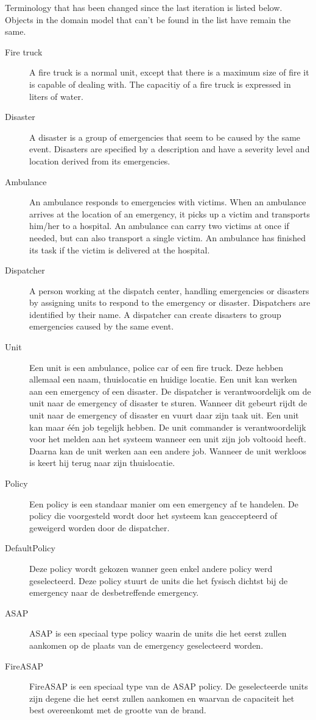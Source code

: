 \label{terminologie}
Terminology that has been changed since the last iteration is listed below. Objects in the domain model that can't be found in the list have remain the same.
\begin{description}
  \item[Fire truck] A fire truck is a normal unit, except that there is a maximum size of fire it is capable of dealing with. The capacitiy of a fire truck is expressed in liters of water.
  \item[Disaster] A disaster is a group of emergencies that seem to be caused by the same event. Disasters are specified by a description and have a severity level and location derived from its emergencies.
  \item[Ambulance] An ambulance responds to emergencies with victims. When an ambulance arrives at the location of an emergency, it picks up a victim and transports him/her to a hospital. An ambulance can carry two victims at once if needed, but can also transport a single victim. An ambulance has finished its task if the victim is delivered at the hospital. 
  \item[Dispatcher] A person working at the dispatch center, handling emergencies or disasters by assigning units to respond to the emergency or disaster. Dispatchers are identified by their name. A dispatcher can create disasters to group emergencies caused by the same event.
  \item[Unit] Een unit is een ambulance, police car of een fire truck. Deze hebben allemaal een naam, thuislocatie en huidige locatie. Een unit kan werken aan een emergency of een disaster. De dispatcher is verantwoordelijk om de unit naar de emergency of disaster te sturen. Wanneer dit gebeurt rijdt de unit naar de emergency of disaster en vuurt daar zijn taak uit. Een unit kan maar \'e\'en job tegelijk hebben. De unit commander is verantwoordelijk voor het melden aan het systeem wanneer een unit zijn job voltooid heeft. Daarna kan de unit werken aan een andere job. Wanneer de unit werkloos is keert hij terug naar zijn thuislocatie.
  \item[Policy]  Een policy is een standaar manier om een emergency af te handelen. De policy die voorgesteld wordt door het systeem kan geaccepteerd of geweigerd worden door de dispatcher.
  \item[DefaultPolicy] Deze policy wordt gekozen wanner geen enkel andere policy werd geselecteerd. Deze policy stuurt de units die het fysisch dichtst bij de emergency naar de desbetreffende emergency.
  \item[ASAP] ASAP is een speciaal type policy waarin de units die het eerst zullen aankomen op de plaats van de emergency geselecteerd worden.
  \item[FireASAP] FireASAP is een speciaal type van de ASAP policy. De geselecteerde units zijn degene die het eerst zullen aankomen en waarvan de capaciteit het best overeenkomt met de grootte van de brand.
\end{description}

